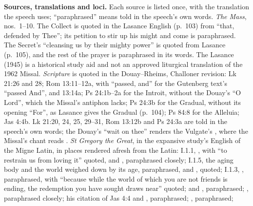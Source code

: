 {\textbf{Sources, translations and loci.} Each source is listed once, with the
translation the speech uses; ``paraphrased'' means told in the speech's own
words. \emph{The Mass}, nos.~1--10. The Collect is quoted in the Lasance
English (p.~103) from ``that, defended by Thee''; its petition to stir up his
might and come is paraphrased. The Secret's ``cleansing us by their mighty
power'' is quoted from Lasance (p.~105), and the rest of the prayer is
paraphrased in its words. The Lasance  (1945) is a
historical study aid and not an approved liturgical translation of the 1962
Missal. \emph{Scripture} is quoted in the Douay--Rheims, Challoner revision:
Lk 21:26 and 28; Rom 13:11--12a, with ``passed, and'' for the Gutenberg text's
``passed And'', and 13:14a; Ps 24:1b--2a for the Introit, without the Douay's
``O Lord'', which the Missal's antiphon lacks; Ps 24:3b for the Gradual,
without its opening ``For'', as Lasance gives the Gradual (p.~104); Ps 84:8
for the Alleluia; Jas 4:4b. Lk 21:20, 24, 25, 29--31, Rom 13:12b and Ps 24:3a
are told in the speech's own words; the Douay's ``wait on thee'' renders the
Vulgate's , where the Missal's chant reads . \emph{St Gregory the Great}, in the expansive study's English of
the Migne Latin, in places rendered afresh from the Latin:  I.1.1, , with ``to
restrain us from loving it'' quoted, and , paraphrased closely; I.1.5, the aging body and the world weighed
down by its age, paraphrased, and , quoted; I.1.3, , paraphrased, with ``because while the world of which you
are not friends is ending, the redemption you have sought draws near'' quoted;
 and , paraphrased; , paraphrased closely;
his citation of Jas 4:4 and ,
paraphrased; , paraphrased; }
